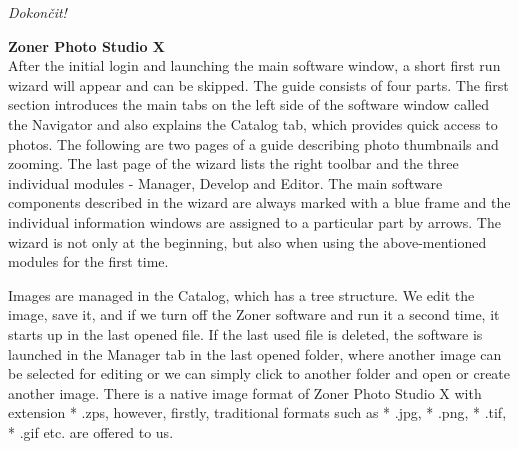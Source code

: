 \documentclass[a4paper,10pt,twoside]{article}
\begin{document}
\noindent \textit{\color{red}Dokončit!}

\noindent \textbf{Zoner Photo Studio X} \\

\noindent After the initial login and launching the main software window, a short first run wizard will appear and can be skipped. The guide consists of four parts. The first section introduces the main tabs on the left side of the software window called the Navigator and also explains the Catalog tab, which provides quick access to photos. The following are two pages of a guide describing photo thumbnails and zooming. The last page of the wizard lists the right toolbar and the three individual modules - Manager, Develop and Editor. The main software components described in the wizard are always marked with a blue frame and the individual information windows are assigned to a particular part by arrows. The wizard is not only at the beginning, but also when using the above-mentioned modules for the first time.

Images are managed in the Catalog, which has a tree structure. We edit the image, save it, and if we turn off the Zoner software and run it a second time, it starts up in the last opened file. If the last used file is deleted, the software is launched in the Manager tab in the last opened folder, where another image can be selected for editing or we can simply click to another folder and open or create another image. There is a native image format of Zoner Photo Studio X with extension * .zps, however, firstly, traditional formats such as * .jpg, * .png, * .tif, * .gif etc. are offered to us.
\end{document}
